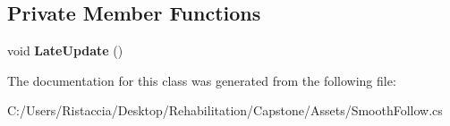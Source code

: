 \subsection*{Private Member Functions}
\begin{DoxyCompactItemize}
\item 
\mbox{\label{class_smooth_follow_c_sharp_a083eef72fc2d69a8486884c61db3e7c5}} 
void {\bfseries Late\+Update} ()
\end{DoxyCompactItemize}


The documentation for this class was generated from the following file\+:\begin{DoxyCompactItemize}
\item 
C\+:/\+Users/\+Ristaccia/\+Desktop/\+Rehabilitation/\+Capstone/\+Assets/Smooth\+Follow.\+cs\end{DoxyCompactItemize}
